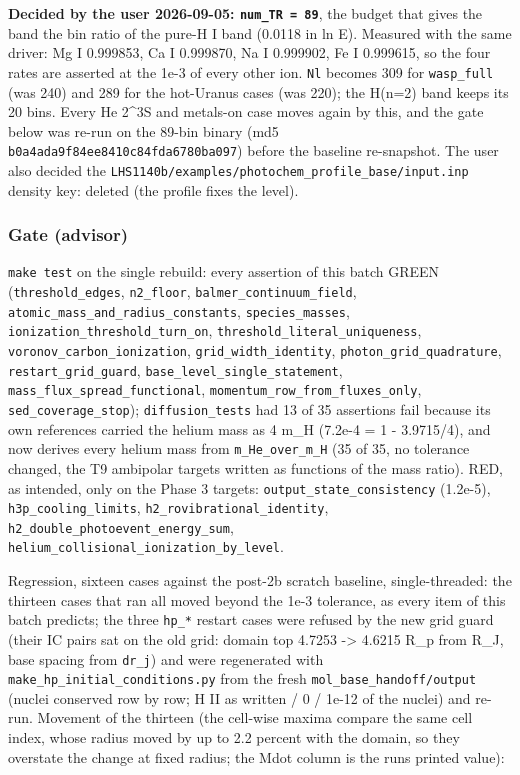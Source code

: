 \documentclass[english,a4paper]{my_memo}
\begin{document}
\textbf{Decided by the user 2026-09-05: \texttt{num\_TR\ =\ 89}}, the budget that gives the
band the bin ratio of the pure-H I band (0.0118 in ln E). Measured with the
same driver: Mg I 0.999853, Ca I 0.999870, Na I 0.999902, Fe I 0.999615, so
the four rates are asserted at the 1e-3 of every other ion. \texttt{Nl} becomes
309 for \texttt{wasp\_full} (was 240) and 289 for the hot-Uranus cases (was 220);
the H(n=2) band keeps its 20 bins. Every He 2\^{}3S and metals-on case moves
again by this, and the gate below was re-run on the 89-bin binary (md5
\texttt{b0a4ada9f84ee8410c84fda6780ba097}) before the baseline re-snapshot. The
user also decided the \texttt{LHS1140b/examples/photochem\_profile\_base/input.inp}
density key: deleted (the profile fixes the level).

\subsubsection{Gate (advisor)}\label{gate-advisor}

\texttt{make\ test} on the single rebuild: every assertion of this batch GREEN
(\texttt{threshold\_edges}, \texttt{n2\_floor}, \texttt{balmer\_continuum\_field},
\texttt{atomic\_mass\_and\_radius\_constants}, \texttt{species\_masses},
\texttt{ionization\_threshold\_turn\_on}, \texttt{threshold\_literal\_uniqueness},
\texttt{voronov\_carbon\_ionization}, \texttt{grid\_width\_identity}, \texttt{photon\_grid\_quadrature},
\texttt{restart\_grid\_guard}, \texttt{base\_level\_single\_statement},
\texttt{mass\_flux\_spread\_functional}, \texttt{momentum\_row\_from\_fluxes\_only},
\texttt{sed\_coverage\_stop}); \texttt{diffusion\_tests} had 13 of 35 assertions fail because
its own references carried the helium mass as 4 m\_H (7.2e-4 = 1 - 3.9715/4),
and now derives every helium mass from \texttt{m\_He\_over\_m\_H} (35 of 35, no
tolerance changed, the T9 ambipolar targets written as functions of the
mass ratio). RED, as intended, only on the Phase 3 targets:
\texttt{output\_state\_consistency} (1.2e-5), \texttt{h3p\_cooling\_limits},
\texttt{h2\_rovibrational\_identity}, \texttt{h2\_double\_photoevent\_energy\_sum},
\texttt{helium\_collisional\_ionization\_by\_level}.

Regression, sixteen cases against the post-2b scratch baseline,
single-threaded: the thirteen cases that ran all moved beyond the 1e-3
tolerance, as every item of this batch predicts; the three \texttt{hp\_*} restart
cases were refused by the new grid guard (their IC pairs sat on the old
grid: domain top 4.7253 -\textgreater{} 4.6215 R\_p from R\_J, base spacing from \texttt{dr\_j})
and were regenerated with \texttt{make\_hp\_initial\_conditions.py} from the fresh
\texttt{mol\_base\_handoff/output} (nuclei conserved row by row; H II as written /
0 / 1e-12 of the nuclei) and re-run. Movement of the thirteen (the
cell-wise maxima compare the same cell index, whose radius moved by up to
2.2 percent with the domain, so they overstate the change at fixed radius;
the Mdot column is the run\textquotesingle s printed value):
\end{document}
